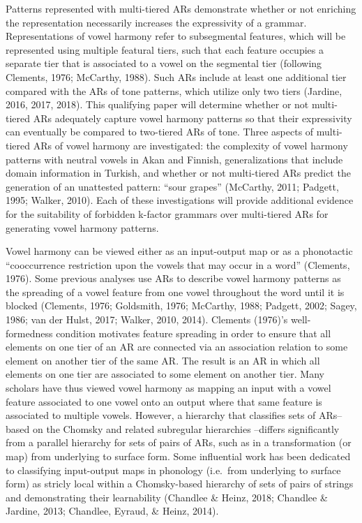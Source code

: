 \documentclass[,doc,floatsintext]{apa6}
\theoremstyle{definition}
\theoremstyle{definition}
\theoremstyle{definition}
\theoremstyle{remark}
\begin{document}
Patterns represented with multi-tiered ARs demonstrate whether or not
enriching the representation necessarily increases the expressivity of a
grammar. Representations of vowel harmony refer to subsegmental
features, which will be represented using multiple featural tiers, such
that each feature occupies a separate tier that is associated to a vowel
on the segmental tier (following Clements, 1976; McCarthy, 1988). Such
ARs include at least one additional tier compared with the ARs of tone
patterns, which utilize only two tiers (Jardine, 2016, 2017, 2018). This
qualifying paper will determine whether or not multi-tiered ARs
adequately capture vowel harmony patterns so that their expressivity can
eventually be compared to two-tiered ARs of tone. Three aspects of
multi-tiered ARs of vowel harmony are investigated: the complexity of
vowel harmony patterns with neutral vowels in Akan and Finnish,
generalizations that include domain information in Turkish, and whether
or not multi-tiered ARs predict the generation of an unattested pattern:
\enquote{sour grapes} (McCarthy, 2011; Padgett, 1995; Walker, 2010).
Each of these investigations will provide additional evidence for the
suitability of forbidden k-factor grammars over multi-tiered ARs for
generating vowel harmony patterns.

Vowel harmony can be viewed either as an input-output map or as a
phonotactic \enquote{cooccurrence restriction upon the vowels that may
occur in a word} (Clements, 1976). Some previous analyses use ARs to
describe vowel harmony patterns as the spreading of a vowel feature from
one vowel throughout the word until it is blocked (Clements, 1976;
Goldsmith, 1976; McCarthy, 1988; Padgett, 2002; Sagey, 1986; van der
Hulst, 2017; Walker, 2010, 2014). Clements (1976)'s well-formedness
condition motivates feature spreading in order to ensure that all
elements on one tier of an AR are connected via an association relation
to some element on another tier of the same AR. The result is an AR in
which all elements on one tier are associated to some element on another
tier. Many scholars have thus viewed vowel harmony as mapping an input
with a vowel feature associated to one vowel onto an output where that
same feature is associated to multiple vowels. However, a hierarchy that
classifies sets of ARs-- based on the Chomsky and related subregular
hierarchies --differs significantly from a parallel hierarchy for sets
of pairs of ARs, such as in a transformation (or map) from underlying to
surface form. Some influential work has been dedicated to classifying
input-output maps in phonology (i.e.~from underlying to surface form) as
stricly local within a Chomsky-based hierarchy of sets of pairs of
strings and demonstrating their learnability (Chandlee \& Heinz, 2018;
Chandlee \& Jardine, 2013; Chandlee, Eyraud, \& Heinz, 2014).
\end{document}
